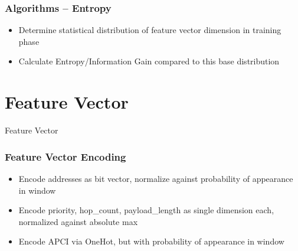 \begin{frame}[c]
	\frametitle{Algorithms -- Entropy}
	
	\begin{itemize}
	\item Determine statistical distribution of feature vector dimension in training phase
	\item Calculate Entropy/Information Gain compared to this base distribution
	\end{itemize}
\end{frame}

\section{Feature Vector}
\begin{frame}[c]
	\centering
	\LARGE Feature Vector
\end{frame}

\begin{frame}[c]
	\frametitle{Feature Vector Encoding}
	
	\begin{itemize}
		\item Encode addresses as bit vector, normalize against probability of appearance in window
		\item Encode priority, hop\_count, payload\_length as single dimension each, normalized against absolute max
		\item Encode APCI via OneHot, but with probability of appearance in window
	\end{itemize}
\end{frame}